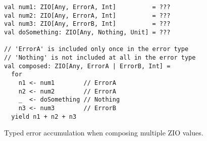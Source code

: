 \begin{algorithm}

\begin{verbatim}
val num1: ZIO[Any, ErrorA, Int]          = ???
val num2: ZIO[Any, ErrorA, Int]          = ???
val num3: ZIO[Any, ErrorB, Int]          = ???
val doSomething: ZIO[Any, Nothing, Unit] = ???

// 'ErrorA' is included only once in the error type
// 'Nothing' is not included at all in the error type
val composed: ZIO[Any, ErrorA | ErrorB, Int] =
  for
    n1 <- num1        // ErrorA
    n2 <- num2        // ErrorA
    _  <- doSomething // Nothing
    n3 <- num3        // ErrorB
  yield n1 + n2 + n3
\end{verbatim}

\caption{Typed error accumulation when composing multiple ZIO values. \label{zio:error-accumulation}}
\end{algorithm}